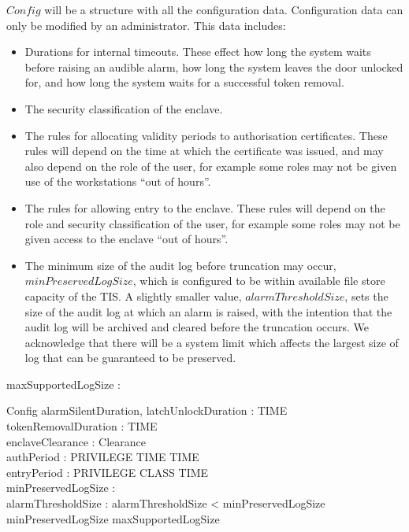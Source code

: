 $Config$ will be a structure with all the configuration data. 
Configuration data can only be modified by an administrator.
This data includes:
\begin{itemize}
\item 
Durations for internal timeouts. These effect how long the
system waits before raising an audible alarm, how long the system
leaves the door unlocked for, and how long the system waits for a
successful token removal.
\item
The security classification of the enclave.
\item
The rules for allocating validity periods to authorisation
certificates. These rules will depend on the time at which the
certificate was issued, and may also depend on the role of the user,
for example some roles may not be given use of the workstations ``out
of hours''. 
\item
The rules for allowing entry to the enclave. These rules will depend
on the role and security classification of the user, for example some
roles may not be given
access to the enclave ``out of hours''. 
\item
The minimum size of the audit
log before truncation may occur, $minPreservedLogSize$, which is configured to be within available file
store capacity of the TIS. A slightly smaller value, $alarmThresholdSize$,
sets the size of the audit log at which an alarm is raised, 
with the intention that the
audit log will be archived and cleared before the truncation occurs.
We acknowledge that there will be a system limit which affects the
largest size of log that can be guaranteed to be preserved.
\end{itemize}

\begin{lateaxdef}
        maxSupportedLogSize : \nat
\end{lateaxdef}


\begin{lateschema}{Config}
	alarmSilentDuration, latchUnlockDuration : TIME
\\      tokenRemovalDuration : TIME
\\      enclaveClearance : Clearance
\\      authPeriod : PRIVILEGE \fun TIME \fun \power TIME
\\      entryPeriod : PRIVILEGE \fun CLASS \fun \power TIME
\\      minPreservedLogSize : \nat
\\      alarmThresholdSize : \nat
\where
        alarmThresholdSize < minPreservedLogSize 
\\      minPreservedLogSize \leq maxSupportedLogSize     
\end{lateschema}

